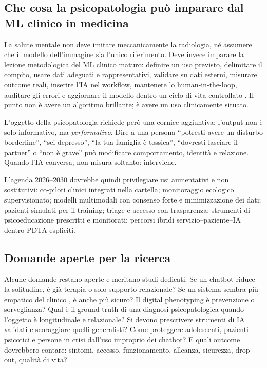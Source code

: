 \documentclass[11pt,a4paper]{article}
\begin{document}
\subsection{Che cosa la psicopatologia può imparare dal ML clinico in medicina}

La salute mentale non deve imitare meccanicamente la radiologia, né assumere che il modello dell'immagine sia l'unico riferimento. Deve invece imparare la lezione metodologica del ML clinico maturo: definire un uso previsto, delimitare il compito, usare dati adeguati e rappresentativi, validare su dati esterni, misurare outcome reali, inserire l'IA nel workflow, mantenere lo human-in-the-loop, auditare gli errori e aggiornare il modello dentro un ciclo di vita controllato \cite{topol2019}. Il punto non è avere un algoritmo brillante; è avere un uso clinicamente situato.

L'oggetto della psicopatologia richiede però una cornice aggiuntiva: l'output non è solo informativo, ma \emph{performativo}. Dire a una persona ``potresti avere un disturbo borderline'', ``sei depresso'', ``la tua famiglia è tossica'', ``dovresti lasciare il partner'' o ``non è grave'' può modificare comportamento, identità e relazione. Quando l'IA conversa, non misura soltanto: interviene.

L'agenda 2026--2030 dovrebbe quindi privilegiare usi aumentativi e non sostitutivi: co-piloti clinici integrati nella cartella; monitoraggio ecologico supervisionato; modelli multimodali con consenso forte e minimizzazione dei dati; pazienti simulati per il training; triage e accesso con trasparenza; strumenti di psicoeducazione prescritti e monitorati; percorsi ibridi servizio--paziente--IA dentro PDTA espliciti.

\subsection{Domande aperte per la ricerca}

Alcune domande restano aperte e meritano studi dedicati. Se un chatbot riduce la solitudine, è già terapia o solo supporto relazionale? Se un sistema sembra più empatico del clinico \cite{welivita2024,lee2024}, è anche più sicuro? Il digital phenotyping è prevenzione o sorveglianza? Qual è il ground truth di una diagnosi psicopatologica quando l'oggetto è longitudinale e relazionale? Si devono prescrivere strumenti di IA validati e scoraggiare quelli generalisti? Come proteggere adolescenti, pazienti psicotici e persone in crisi dall'uso improprio dei chatbot? E quali outcome dovrebbero contare: sintomi, accesso, funzionamento, alleanza, sicurezza, drop-out, qualità di vita?
\end{document}
